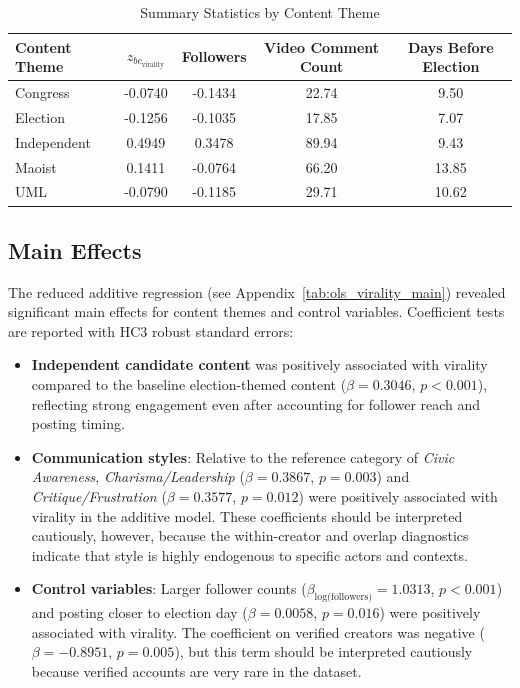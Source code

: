 \documentclass[12pt,a4paper]{report}
\begin{document}
\begin{table}[ht]
\centering
\caption{Summary Statistics by Content Theme}
\scriptsize
\label{tab:summary_stats}
\begin{tabular}{lcccc}
\toprule
\textbf{Content Theme} & \textbf{$z_{bc_{\text{virality}}}$} & \textbf{Followers} & \textbf{Video Comment Count} & \textbf{Days Before Election} \\
\midrule
Congress & -0.0740 & -0.1434 & 22.74 & 9.50 \\
Election & -0.1256 & -0.1035 & 17.85 & 7.07 \\
Independent & 0.4949 & 0.3478 & 89.94 & 9.43 \\
Maoist & 0.1411 & -0.0764 & 66.20 & 13.85 \\
UML & -0.0790 & -0.1185 & 29.71 & 10.62 \\
\bottomrule
\end{tabular}
\end{table}
\newpage
\subsection{Main Effects}
The reduced additive regression (see Appendix~\ref{tab:ols_virality_main}) revealed significant main effects for content themes and control variables. Coefficient tests are reported with HC3 robust standard errors:
\begin{itemize}[noitemsep]
    \item \textbf{Independent candidate content} was positively associated with virality compared to the baseline election-themed content ($\beta = 0.3046$, $p < 0.001$), reflecting strong engagement even after accounting for follower reach and posting timing.
    \item \textbf{Communication styles}: Relative to the reference category of \textit{Civic Awareness}, \textit{Charisma/Leadership} ($\beta = 0.3867$, $p = 0.003$) and \textit{Critique/Frustration} ($\beta = 0.3577$, $p = 0.012$) were positively associated with virality in the additive model. These coefficients should be interpreted cautiously, however, because the within-creator and overlap diagnostics indicate that style is highly endogenous to specific actors and contexts.
    \item \textbf{Control variables}: Larger follower counts ($\beta_{\text{log(followers)}} = 1.0313$, $p < 0.001$) and posting closer to election day ($\beta = 0.0058$, $p = 0.016$) were positively associated with virality. The coefficient on verified creators was negative ($\beta = -0.8951$, $p = 0.005$), but this term should be interpreted cautiously because verified accounts are very rare in the dataset.
\end{itemize}
\end{document}
